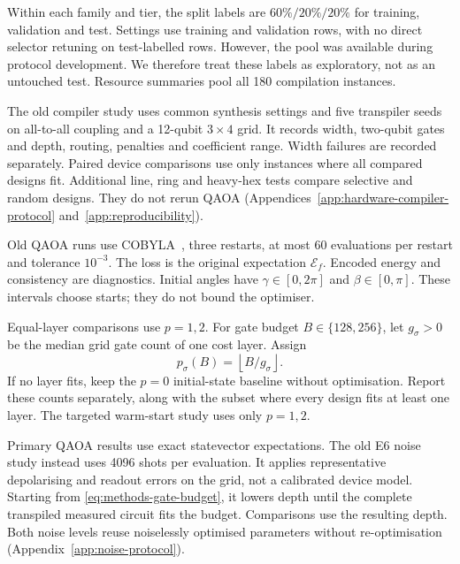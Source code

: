 \documentclass[a4paper,onecolumn,11pt,unpublished]{quantumarticle}
\theoremstyle{remark}
\begin{document}
Within each family and tier, the split labels are $60\%/20\%/20\%$
for training, validation and test. Settings use training and validation
rows, with no direct selector retuning on test-labelled rows.
However, the pool was available during protocol development.
We therefore treat these labels as exploratory, not as an untouched test.
Resource summaries pool all 180 compilation instances.

The old compiler study uses common synthesis settings and five transpiler
seeds on all-to-all coupling and a 12-qubit $3\times4$ grid.
It records width, two-qubit gates and depth, routing, penalties and
coefficient range. Width failures are recorded separately.
Paired device comparisons use only instances where all compared designs fit.
Additional line, ring and heavy-hex tests compare selective and random
designs. They do not rerun QAOA
(Appendices~\ref{app:hardware-compiler-protocol} and~\ref{app:reproducibility}).

Old QAOA runs use COBYLA~\cite{Powell1994}, three restarts, at most
60 evaluations per restart and tolerance $10^{-3}$.
The loss is the original expectation $\mathcal E_f$.
Encoded energy and consistency are diagnostics.
Initial angles have $\gamma\in[0,2\pi]$ and $\beta\in[0,\pi]$.
These intervals choose starts; they do not bound the optimiser.

Equal-layer comparisons use $p=1,2$.
For gate budget $B\in\{128,256\}$, let $g_\sigma>0$ be the median grid
gate count of one cost layer. Assign
\begin{equation}
 p_\sigma(B)=\left\lfloor B/g_\sigma\right\rfloor.
 \label{eq:methods-gate-budget}
\end{equation}
If no layer fits, keep the $p=0$ initial-state baseline without optimisation.
Report these counts separately, along with the subset where every design
fits at least one layer. The targeted warm-start study uses only $p=1,2$.

Primary QAOA results use exact statevector expectations.
The old E6 noise study instead uses 4096 shots per evaluation.
It applies representative depolarising and readout errors on the grid,
not a calibrated device model.
Starting from \cref{eq:methods-gate-budget}, it lowers depth until the
complete transpiled measured circuit fits the budget.
Comparisons use the resulting depth.
Both noise levels reuse noiselessly optimised parameters without
re-optimisation (Appendix~\ref{app:noise-protocol}).
\end{document}
